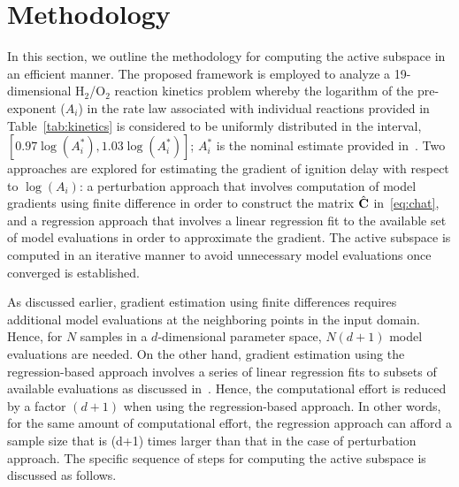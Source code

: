 \section{Methodology}
\label{sec:method}

In this section, we outline the methodology for computing the
active subspace in an efficient manner. The proposed framework is employed to analyze 
a 19-dimensional H$_2$/O$_2$ reaction kinetics
problem whereby the logarithm of the 
pre-exponent ($A_i$) in the rate law associated with individual reactions provided in
Table~\ref{tab:kinetics} is considered to be uniformly
distributed in the interval, $[0.97\log(A_i^\ast), 1.03\log(A_i^\ast)]$;
$A_i^\ast$ is the nominal
estimate provided in~\cite{Yetter:1991}.
Two approaches are explored for estimating the gradient of ignition delay with
respect to $\log(A_i)$: 
a perturbation  approach that involves computation of model
gradients using finite difference in order to construct the matrix $\hat{\mathbf{{C}}}$
in~\eqref{eq:chat}, and a regression  approach 
that involves a linear regression fit to the available set of
model evaluations in order to approximate the gradient. 
The active subspace is computed in an iterative manner to avoid
unnecessary model evaluations once converged is established.


As discussed earlier, gradient estimation using finite differences 
requires additional model evaluations at the
neighboring points in the input domain. 
Hence, for $N$ samples in a $d$-dimensional parameter space, $N(d+1)$
model evaluations are needed. On the other hand, gradient estimation
using the regression-based approach involves a series of linear regression
fits to subsets of available evaluations as discussed 
in~\cite[Algorithm 1.2]{Constantine:2015}. Hence, the computational effort is  
reduced by a factor $(d+1)$ when using the regression-based approach.
In other words, for the same amount of computational effort, the regression
approach can afford a sample size that is (d+1) times larger than that in the
case of perturbation approach.
The specific sequence of steps
for computing the active subspace is discussed as follows.   

